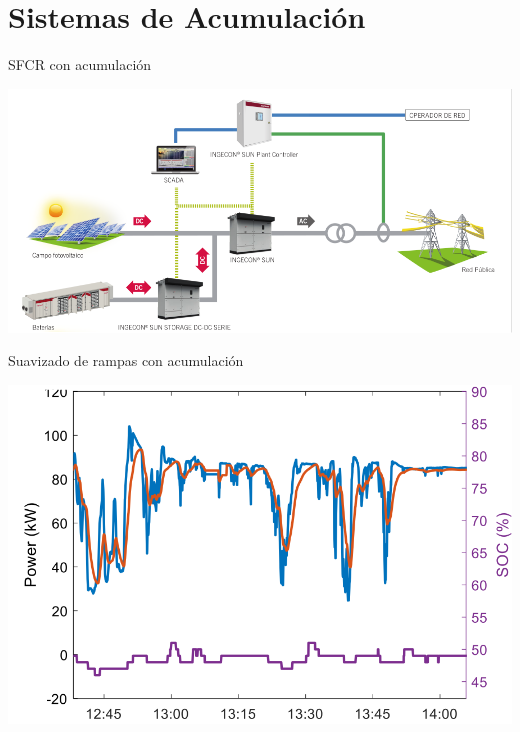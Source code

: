 \documentclass[aspectratio=169, usenames,svgnames,dvipsnames]{beamer}
\begin{document}
\section{Sistemas de Acumulación}
\label{sec:org5f7476c}

\begin{frame}[label={sec:org42bcee9}]{SFCR con acumulación}
\begin{center}
\includegraphics[width=\textwidth]{../figs/EsquemaSFCRAcumulacion.pdf}
\end{center}
\end{frame}

\begin{frame}[label={sec:org199f82e}]{Suavizado de rampas con acumulación}
\begin{center}
\includegraphics[height=0.9\textheight]{../figs/SuavizadoRampasAcumulacion.png}
\end{center}
\end{frame}
\end{document}
